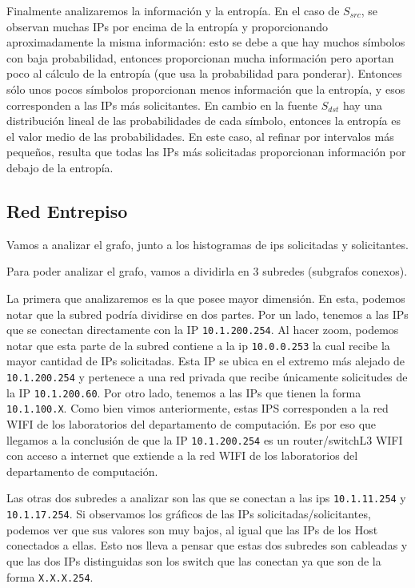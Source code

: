 Finalmente analizaremos la información y la entropía. En el caso de $S_{src}$, se observan muchas IPs por encima de la entropía y proporcionando aproximadamente la misma información: esto se debe a que hay muchos símbolos con baja probabilidad, entonces proporcionan mucha información pero aportan
poco al cálculo de la entropía (que usa la probabilidad para ponderar). Entonces sólo unos pocos símbolos proporcionan menos información que la entropía,
y esos corresponden a las IPs más solicitantes. En cambio en la fuente $S_{dst}$ hay una distribución lineal de las probabilidades de cada símbolo, entonces
la entropía es el valor medio de las probabilidades. En este caso, al refinar por intervalos más pequeños, resulta que todas las IPs más solicitadas
proporcionan información por debajo de la entropía.

\subsection{Red Entrepiso}

Vamos a analizar el grafo, junto a los histogramas de ips solicitadas y solicitantes.

Para poder analizar el grafo, vamos a dividirla en 3 subredes (subgrafos conexos).

La primera que analizaremos es la que posee mayor dimensión. En esta, podemos notar que la subred podría dividirse en dos partes. Por un lado, tenemos a las IPs que se conectan directamente con la IP {\tt 10.1.200.254}. Al hacer zoom, podemos notar que esta parte de la subred contiene a la ip {\tt 10.0.0.253} la cual recibe la mayor cantidad de IPs solicitadas. Esta IP se ubica en el extremo más alejado de {\tt 10.1.200.254} y pertenece a una red privada que recibe únicamente solicitudes de la IP {\tt 10.1.200.60}. 
Por otro lado, tenemos a las IPs que tienen la forma {\tt 10.1.100.X}. Como bien vimos anteriormente, estas IPS corresponden a la red WIFI de los laboratorios del departamento de computación. Es por eso que llegamos a la conclusión de que la IP {\tt 10.1.200.254} es un router/switchL3 WIFI con acceso a internet que extiende a la red WIFI de los laboratorios del departamento de computación. 

Las otras dos subredes a analizar son las que se conectan a las ips {\tt 10.1.11.254} y {\tt 10.1.17.254}. Si observamos los gráficos de las IPs solicitadas/solicitantes, podemos ver que sus valores son muy bajos, al igual que las IPs de los Host conectados a ellas. Esto nos lleva a pensar que estas dos subredes son cableadas y que las dos IPs distinguidas son los switch que las conectan ya que son de la forma {\tt X.X.X.254}.

